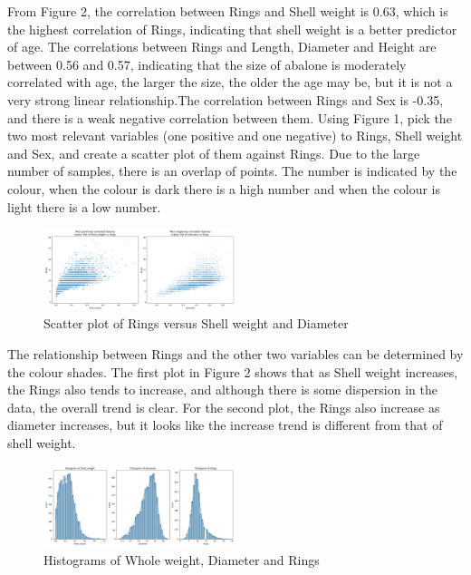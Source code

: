 \documentclass[conference]{IEEEtran}
\begin{document}
From Figure 2, the correlation between Rings and Shell weight is 0.63, which is the highest correlation of Rings, indicating that shell weight is a better predictor of age. The correlations between Rings and Length, Diameter and Height are between 0.56 and 0.57, indicating that the size of abalone is moderately correlated with age, the larger the size, the older the age may be, but it is not a very strong linear relationship.The correlation between Rings and Sex is -0.35, and there is a weak negative correlation between them.
Using Figure 1, pick the two most relevant variables (one positive and one negative) to Rings, Shell weight and Sex, and create a scatter plot of them against Rings. Due to the large number of samples, there is an overlap of points. The number is indicated by the colour, when the colour is dark there is a high number and when the colour is light there is a low number.

\begin{figure}[H]
    \centering
    \includegraphics[width=0.5\textwidth]{scatter.png} %
    \caption{Scatter plot of Rings versus Shell weight and Diameter}
    \label{fig:example2_image}
\end{figure}

The relationship between Rings and the other two variables can be determined by the colour shades. The first plot in Figure 2 shows that as Shell weight increases, the Rings also tends to increase, and although there is some dispersion in the data, the overall trend is clear. For the second plot, the Rings also increase as diameter increases, but it looks like the increase trend is different from that of shell weight.

\begin{figure}[H]
    \centering
    \includegraphics[width=0.5\textwidth]{hist.png} %
    \caption{Histograms of Whole weight, Diameter and Rings}
    \label{fig:example2_image}
\end{figure}
\end{document}
